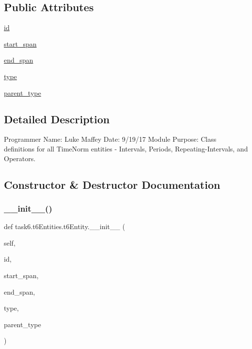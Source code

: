 \subsection*{Public Attributes}
\begin{DoxyCompactItemize}
\item 
\hyperlink{classtask6_1_1t6Entities_1_1t6Entity_a96b2e7fb553c920ab2db6f6deb31e3b4}{id}
\item 
\hyperlink{classtask6_1_1t6Entities_1_1t6Entity_a8221c36d2995a24200cdfbd74cc9233c}{start\+\_\+span}
\item 
\hyperlink{classtask6_1_1t6Entities_1_1t6Entity_a597d42bb02fc9f42277098f0ce21917c}{end\+\_\+span}
\item 
\hyperlink{classtask6_1_1t6Entities_1_1t6Entity_af0496eb852234bb168ab22d031c99ed3}{type}
\item 
\hyperlink{classtask6_1_1t6Entities_1_1t6Entity_a18ba365facb8cb062830abb11cf741f6}{parent\+\_\+type}
\end{DoxyCompactItemize}


\subsection{Detailed Description}
Programmer Name\+: Luke Maffey Date\+: 9/19/17 Module Purpose\+: Class definitions for all Time\+Norm entities -\/ Intervals, Periods, Repeating-\/\+Intervals, and Operators. 

\subsection{Constructor \& Destructor Documentation}
\mbox{\label{classtask6_1_1t6Entities_1_1t6Entity_ac0bcf8dbefa28c8e1a77d891e368c9e1}} 
\subsubsection{\texorpdfstring{\+\_\+\+\_\+init\+\_\+\+\_\+()}{\_\_init\_\_()}}
{\footnotesize\ttfamily def task6.\+t6\+Entities.\+t6\+Entity.\+\_\+\+\_\+init\+\_\+\+\_\+ (\begin{DoxyParamCaption}\item[{}]{self,  }\item[{}]{id,  }\item[{}]{start\+\_\+span,  }\item[{}]{end\+\_\+span,  }\item[{}]{type,  }\item[{}]{parent\+\_\+type }\end{DoxyParamCaption})}



